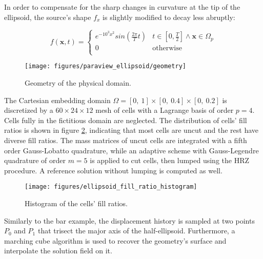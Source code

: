 In order to compensate for the sharp changes in curvature at the tip of the ellipsoid, the source's shape $f_x$ is slightly modified to decay less abruptly:

\begin{equation} \label{eq:ellipsoid_source}
f(\mathbf x,t) = \begin{cases}
e^{-10^3x^2} sin \left( \frac{2 \pi}{T} t \right) & t \in \left[ 0,\frac{T}{2} \right] \land \mathbf x \in \Omega_p \\[0.5em]
0 & \text{otherwise} \\
\end{cases}
\end{equation}

\begin{figure}[!h]
	\centering
	\hspace*{3cm}\texttt{[image: figures/paraview\_ellipsoid/geometry]}
	\caption{Geometry of the physical domain.}
	\label{ref:ellipsoid_geometry}
\end{figure}

The Cartesian embedding domain $\Omega = [0, \ 1] \times [0, \ 0.4] \times [0, \ 0.2]$ is discretized by a $60 \times  24 \times 12$ mesh of cells with a Lagrange basis of order $p=4$. Cells fully in the fictitious domain are neglected. The distribution of cells' fill ratios is shown in figure \ref{fig:ellipsoid_fill_ratio_histogram}, indicating that most cells are uncut and the rest have diverse fill ratios. The mass matrices of uncut cells are integrated with a fifth order Gauss-Lobatto quadrature, while an adaptive scheme with Gauss-Legendre quadrature of order $m=5$ is applied to cut cells, then lumped using the HRZ procedure. A reference solution without lumping is computed as well.

\begin{figure}[!h]
	\centering
	\texttt{[image: figures/ellipsoid\_fill\_ratio\_histogram]}
	\caption{Histogram of the cells' fill ratios.}
	\label{fig:ellipsoid_fill_ratio_histogram}
\end{figure}

Similarly to the bar example, the displacement history is sampled at two points $P_0$ and $P_1$ that trisect the major axis of the half-ellipsoid. Furthermore, a marching cube algorithm is used to recover the geometry's surface and interpolate the solution field on it.

